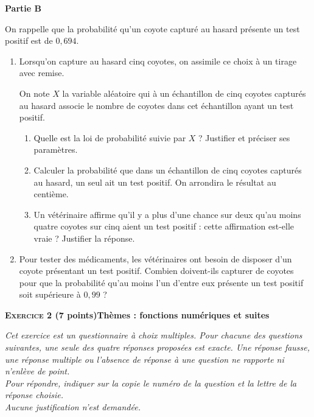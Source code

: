 \documentclass[10pt,a4paper]{article}
\begin{document}
\bigskip

\textbf{Partie B}

\medskip

On rappelle que la probabilité qu'un coyote capturé au hasard présente un test positif est de $0,694$.

\medskip

\begin{enumerate}
\item Lorsqu'on capture au hasard cinq coyotes, on assimile ce choix à un tirage avec remise.

On note $X$ la variable aléatoire qui à un échantillon de cinq coyotes capturés au hasard associe le nombre de coyotes dans cet échantillon ayant un test positif.
\begin{enumerate}
\item Quelle est la loi de probabilité suivie par $X$ ? Justifier et préciser ses paramètres.
\item Calculer la probabilité que dans un échantillon de cinq coyotes capturés au hasard, un seul ait un test positif. On arrondira le résultat au centième.
\item Un vétérinaire affirme qu'il y a plus d'une chance sur deux qu'au moins quatre coyotes sur cinq aient un test positif : cette affirmation est-elle vraie ? Justifier la réponse.
	\end{enumerate}	
\item Pour tester des médicaments, les vétérinaires ont besoin de disposer d'un coyote présentant un test positif. Combien doivent-ils capturer de coyotes pour que la probabilité qu'au moins l'un d'entre eux présente un test positif soit supérieure à $0,99$ ?
\end{enumerate}

\bigskip

\textbf{\textsc{Exercice 2} \quad (7 points)\hfill Thèmes : fonctions numériques et suites}

\medskip

\emph{Cet exercice est un questionnaire à choix multiples. Pour chacune des questions suivantes, une seule des quatre réponses proposées est exacte. Une réponse fausse, une réponse multiple ou l'absence de réponse à une question ne rapporte ni n'enlève de point.\\
Pour répondre, indiquer sur la copie le numéro de la question et la lettre de la réponse choisie.\\Aucune justification n'est demandée.}
\end{document}
